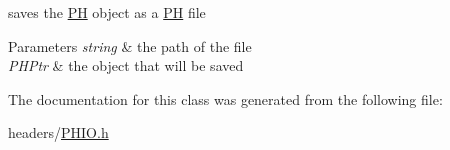 saves the \hyperlink{class_p_h}{\-P\-H} object as a \hyperlink{class_p_h}{\-P\-H} file 


\begin{DoxyParams}{\-Parameters}
{\em string} & the path of the file \\
\hline
{\em \-P\-H\-Ptr} & the object that will be saved \\
\hline
\end{DoxyParams}


\-The documentation for this class was generated from the following file\-:\begin{DoxyCompactItemize}
\item 
headers/\hyperlink{_p_h_i_o_8h}{\-P\-H\-I\-O.\-h}\end{DoxyCompactItemize}
